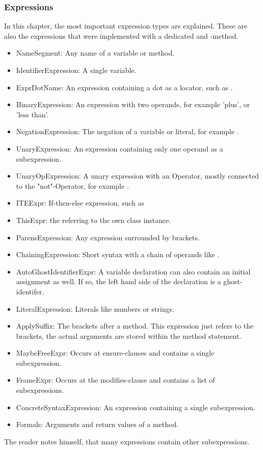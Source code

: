 \subsubsection{Expressions}
In this chapter, the most important expression types are explained.
These are also the expressions that were implemented with a dedicated  and -method.
\begin{itemize}
    \item NameSegment: Any name of a variable or method.  
    \item IdentifierExpression: A single variable.
    \item ExprDotName: An expression containing a dot as a locator, such as .
    \item BinaryExpression: An expression with two operands, for example 'plus', or 'less than'.
    \item NegationExpression: The negation of a variable or literal, for example .
    \item UnaryExpression: An expression containing only one operand as a subexpression.
    \item UnaryOpExpression: A unary expression with an Operator, mostly connected to the "not"-Operator, for example .
    \item ITEExpr: If-then-else expression, such as 
    \item ThisExpr: the  referring to the own class instance.
    \item ParensExpression: Any expression surrounded by brackets.
    \item ChainingExpression: Short syntax with a chain of operands like .
    \item AutoGhostIdentifierExpr: A variable declaration can also contain an initial assignment as well. If so, the left hand side of the declaration is a ghost-identifer.
    \item LiteralExpression: Literals like numbers or strings.
    \item ApplySuffix: The brackets after a method. This expression just refers to the brackets, the actual arguments are stored within the method statement.
    \item MaybeFreeExpr: Occurs at ensure-clauses and contains a single subexpression.
    \item FrameExpr: Occurs at the modifies-clause and contains a list of subexpressions.
    \item ConcreteSyntaxExpression: An expression containing a single subexpression.
    \item Formals: Arguments and return values of a method.
\end{itemize}
The reader notes himself, that many expressions contain other subexpressions.

